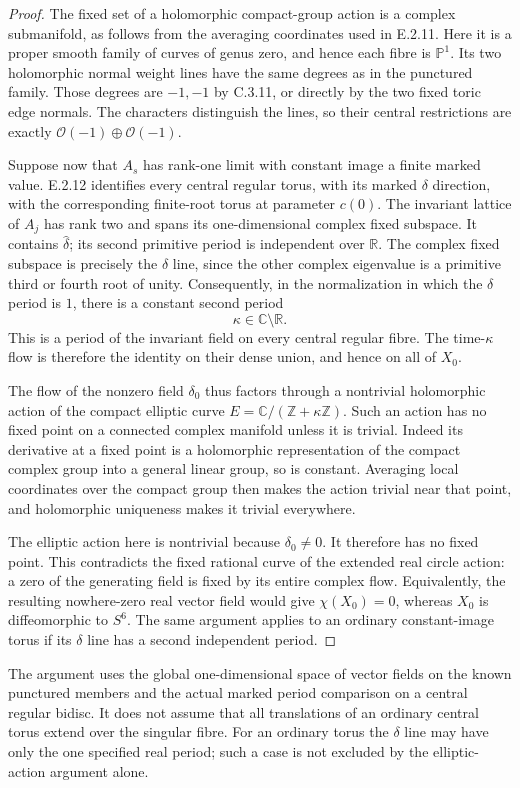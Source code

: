 \begin{proof}
The fixed set of a holomorphic compact-group
action is a complex submanifold, as follows
from the averaging coordinates used in
E.2.11.  Here it is a proper smooth family
of curves of genus zero, and hence each fibre
is $\mathbb P^1$.  Its two holomorphic normal
weight lines have the same degrees as in
the punctured family.  Those degrees are
$-1,-1$ by C.3.11, or directly by the two
fixed toric edge normals.  The characters
distinguish the lines, so their central
restrictions are exactly
$\mathcal O(-1)\oplus\mathcal O(-1)$.

Suppose now that $A_s$ has rank-one limit
with constant image a finite marked value.
E.2.12 identifies every central regular
torus, with its marked $\delta$ direction,
with the corresponding finite-root torus
at parameter $c(0)$.  The invariant lattice
of $A_j$ has rank two and spans its
one-dimensional complex fixed subspace.
It contains $\widehat\delta$; its second
primitive period is independent over
$\mathbb R$.  The complex fixed subspace
is precisely the $\delta$ line, since
the other complex eigenvalue is a
primitive third or fourth root of unity.
Consequently, in the normalization in
which the $\delta$ period is $1$, there
is a constant second period
\[
 \kappa\in\mathbb C\setminus\mathbb R.
\]
This is a period of the invariant field
on every central regular fibre.  The
time-$\kappa$ flow is therefore the
identity on their dense union, and
hence on all of $X_0$.

The flow of the nonzero field $\delta_0$
thus factors through a nontrivial
holomorphic action of the compact
elliptic curve
$E=\mathbb C/(\mathbb Z+\kappa\mathbb Z)$.
Such an action has no fixed point on
a connected complex manifold unless
it is trivial.  Indeed its derivative
at a fixed point is a holomorphic
representation of the compact complex
group into a general linear group,
so is constant.  Averaging local
coordinates over the compact group
then makes the action trivial near
that point, and holomorphic uniqueness
makes it trivial everywhere.

The elliptic action here is nontrivial
because $\delta_0\ne0$.  It therefore
has no fixed point.  This contradicts
the fixed rational curve of the
extended real circle action: a zero
of the generating field is fixed
by its entire complex flow.  Equivalently,
the resulting nowhere-zero real vector
field would give $\chi(X_0)=0$,
whereas $X_0$ is diffeomorphic to $S^6$.
The same argument applies to an ordinary
constant-image torus if its $\delta$
line has a second independent period.
\end{proof}

\begin{remark}
The argument uses the global one-dimensional
space of vector fields on the known punctured
members and the actual marked period comparison
on a central regular bidisc.  It does not
assume that all translations of an ordinary
central torus extend over the singular fibre.
For an ordinary torus the $\delta$ line may
have only the one specified real period;
such a case is not excluded by the
elliptic-action argument alone.
\end{remark}

